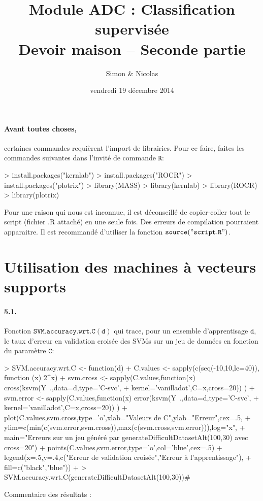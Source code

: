 \documentclass{article}
\title{Module ADC : Classification supervisée \\ Devoir maison -- Seconde partie}
\date{vendredi 19 décembre 2014}
\author{Simon \bsc{Besson-Girard} & Nicolas \bsc{Wattiez}}
\begin{document}
\maketitle

\paragraph{Avant toutes choses,} certaines commandes requièrent 
l'import de librairies. Pour ce 
faire, faites les commandes suivantes dans l'invité de commande 
$\mathtt{R}$:
\begin{Schunk}
\begin{Sinput}
> install.packages("kernlab")
> install.packages("ROCR")
> install.packages("plotrix")
> library(MASS)
> library(kernlab)
> library(ROCR)
> library(plotrix)
\end{Sinput}
\end{Schunk}

Pour une raison qui nous est inconnue, il est déconseillé de 
copier-coller tout le script (fichier .R attaché) en une seule fois. Des
 erreurs de compilation pourraient apparaitre. Il est recommandé 
 d'utiliser la fonction $\mathtt{source("script.R")}$.
 
\section{Utilisation des machines à vecteurs supports}
\paragraph{5.1.}Fonction $\mathtt{SVM.accuracy.wrt.C(d)}$ qui trace, 
pour un ensemble d'apprentisage $\mathtt{d}$, le taux d'erreur en 
validation croisée des SVMs sur un jeu de données en fonction du 
paramètre $\mathtt{C}$:
\begin{Schunk}
\begin{Sinput}
> SVM.accuracy.wrt.C <- function(d) {
+ 	C.values <- sapply(c(seq(-10,10,le=40)), function (x) 2^x)
+ 	svm.cross <- sapply(C.values,function(x) cross(ksvm(Y~.,data=d,type='C-svc',
+ 			kernel='vanilladot',C=x,cross=20)) )
+ 	svm.error <- sapply(C.values,function(x) error(ksvm(Y~.,data=d,type='C-svc',
+ 			kernel='vanilladot',C=x,cross=20)) ) 
+ 	plot(C.values,svm.cross,type='o',xlab="Valeurs de C",ylab="Erreur",cex=.5,
+ 			ylim=c(min(c(svm.error,svm.cross)),max(c(svm.cross,svm.error))),log="x",
+ 			main="Erreurs sur un jeu généré par \n generateDifficultDatasetAlt(100,30) avec cross=20")
+ 	points(C.values,svm.error,type='o',col='blue',cex=.5)
+ 	legend(x=.5,y=.4,c("Erreur de validation croisée","Erreur à l'apprentissage"),
+ 			fill=c("black","blue"))
+ }
> SVM.accuracy.wrt.C(generateDifficultDatasetAlt(100,30))#
\end{Sinput}
\end{Schunk}
\newline
Commentaire des résultats :
\end{document}

